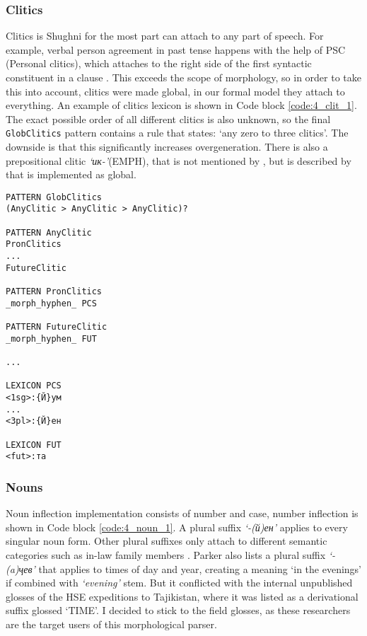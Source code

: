 \subsubsection*{Clitics}
Clitics is Shughni for the most part can attach to any part of speech. For example, verbal person agreement in past tense happens with the help of PSC (Personal clitics), which attaches to the right side of the first syntactic constituent in a clause \parencite[262]{parker_shughni_2023}. This exceeds the scope of morphology, so in order to take this into account, clitics were made global, in our formal model they attach to everything. An example of clitics lexicon is shown in Code block \ref{code:4_clit_1}. The exact possible order of all different clitics is also unknown, so the final \texttt{GlobClitics} pattern contains a rule that states: `any zero to three clitics'. The downside is that this significantly increases overgeneration. There is also a prepositional clitic \textit{`ик-'}(EMPH), that is not mentioned by \textcite{parker_shughni_2023}, but is described by \textcite{karamshoev_dict_1988} that is implemented as global.

\begin{code_frame}[float,floatplacement=!h]
    \begin{footnotesize}\codespacing
    \begin{verbatim}
PATTERN GlobClitics
(AnyClitic > AnyClitic > AnyClitic)?

PATTERN AnyClitic
PronClitics
...
FutureClitic

PATTERN PronClitics
_morph_hyphen_ PCS

PATTERN FutureClitic
_morph_hyphen_ FUT

...

LEXICON PCS
<1sg>:{Й}ум
...
<3pl>:{Й}ен

LEXICON FUT
<fut>:та
    \end{verbatim}
    \end{footnotesize}
    \tcblower
    \label{code:4_clit_1}
\end{code_frame}

\FloatBarrier

\subsubsection*{Nouns}
Noun inflection implementation consists of number and case, number inflection is shown in Code block \ref{code:4_noun_1}. A plural suffix \textit{`-(й)ен'} applies to every singular noun form. Other plural suffixes only attach to different semantic categories such as in-law family members \parencite[148]{parker_shughni_2023}. Parker also lists a plural suffix \textit{`-(a)ҷев'} that applies to times of day and year, creating a meaning `in the evenings' if combined with \textit{`evening'} stem. But it conflicted with the internal unpublished glosses of the HSE expeditions to Tajikistan, where it was listed as a derivational suffix glossed `TIME'. I decided to stick to the field glosses, as these researchers are the target users of this morphological parser. 


